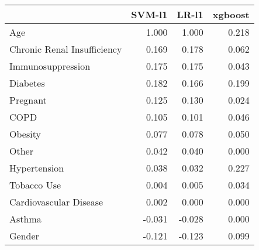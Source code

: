 \begin{tabular}{lrrr}
\toprule
{} &  SVM-l1 &  LR-l1 &  xgboost \\
\midrule
Age                         &   1.000 &  1.000 &    0.218 \\
Chronic Renal Insufficiency &   0.169 &  0.178 &    0.062 \\
Immunosuppression           &   0.175 &  0.175 &    0.043 \\
Diabetes                    &   0.182 &  0.166 &    0.199 \\
Pregnant                    &   0.125 &  0.130 &    0.024 \\
COPD                        &   0.105 &  0.101 &    0.046 \\
Obesity                     &   0.077 &  0.078 &    0.050 \\
Other                       &   0.042 &  0.040 &    0.000 \\
Hypertension                &   0.038 &  0.032 &    0.227 \\
Tobacco Use                 &   0.004 &  0.005 &    0.034 \\
Cardiovascular Disease      &   0.002 &  0.000 &    0.000 \\
Asthma                      &  -0.031 & -0.028 &    0.000 \\
Gender                      &  -0.121 & -0.123 &    0.099 \\
\bottomrule
\end{tabular}

